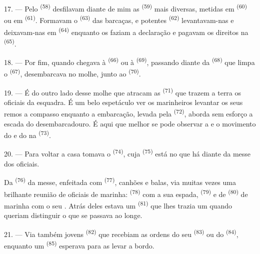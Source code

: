 17. --- Pelo  \textsuperscript{(58)} desfilavam diante de mim as
 \textsuperscript{(59)} mais diversas, metidas em
 \textsuperscript{(60)} ou em  \textsuperscript{(61)}.
Formavam o  \textsuperscript{(63)} das barcaças, e potentes
 \textsuperscript{(62)} levantavam-nas e deixavam-nas em
 \textsuperscript{(64)} enquanto os  faziam
a declaração e pagavam os direitos na  \textsuperscript{(65)}.

18. --- Por fim, quando chegava à 
\textsuperscript{(66)} ou à  \textsuperscript{(69)}, passando diante da
 \textsuperscript{(68)} que limpa o  \textsuperscript{(67)},
desembarcava no molhe, junto ao  \textsuperscript{(70)}.

19. --- É do outro lado desse molhe que atracam as 
\textsuperscript{(71)} que trazem a terra os oficiais da esquadra. É um belo
espetáculo ver os marinheiros levantar os seus remos a compasso enquanto
a embarcação, levada pela  \textsuperscript{(72)}, aborda sem esforço
a escada do desembarcadouro. É aqui que melhor se pode observar a
 e o movimento do  e do  na
 \textsuperscript{(73)}.

\VUsaut{3.0mm}
\VUsaut{3.0mm}

20. --- Para voltar a casa tomava o  \textsuperscript{(74)}, cuja
 \textsuperscript{(75)} está no  que há diante da
messe dos oficiais.

Da  \textsuperscript{(76)} da messe, enfeitada com 
\textsuperscript{(77)}, canhões e balas, via muitas vezes uma brilhante reunião
de oficiais de marinha:  \textsuperscript{(78)} com a
sua espada,  \textsuperscript{(79)} e de
 \textsuperscript{(80)} de marinha com o seu .
Atrás deles estava um  \textsuperscript{(81)} que lhes trazia
um  quando queriam distinguir o que se passava ao longe.

21. --- Via também jovens  \textsuperscript{(82)} que
recebiam as ordens do seu  \textsuperscript{(83)} ou do
 \textsuperscript{(84)}, enquanto um 
\textsuperscript{(85)} esperava para as levar a bordo.

